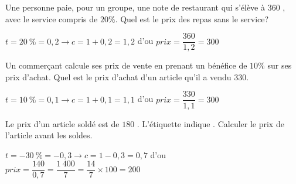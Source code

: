 \documentclass[11pt,a4paper]{article}  %
\begin{document}

\begin{enumMet}
	\item Une personne paie, pour un groupe, une note de restaurant qui s'élève à 360 \EUR{}, avec le service compris de $20 \%$. Quel est le prix des repas sans le service?
	\begin{corrBox}
		$t=20\ \%=0,2\longrightarrow c=1+0,2=1,2$ d'ou $prix=\dfrac{360}{1,2}=300$ \EUR{}		
	\end{corrBox}
	\item {} Un commerçant calcule ses prix de vente en prenant un bénéfice de $10 \%$ sur ses prix d'achat. Quel est le prix d'achat d'un article qu'il a vendu $330$\EUR{}.
	\begin{corrBox}
		$t=10\ \%=0,1\longrightarrow c=1+0,1=1,1$ d'ou $prix=\dfrac{330}{1,1}=300$ \EUR{}		
	\end{corrBox}
	\item Le prix d'un article soldé est de $180$ \EUR{}. L'étiquette indique . Calculer le prix de l'article avant les soldes.
	\begin{corrBox}
		$t=-30\ \%=-0,3\longrightarrow c=1-0,3=0,7$ d'ou $prix=\dfrac{140}{0,7}=\dfrac{1\ 400}{7}=\dfrac{14}{7}\times 100=200$ \EUR{}		
	\end{corrBox}
	
\end{enumMet}
\end{document}
